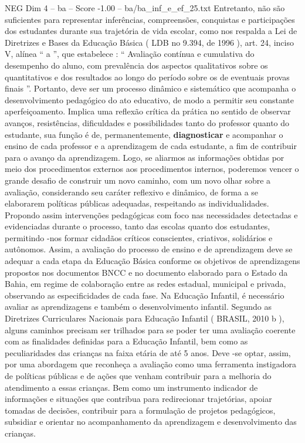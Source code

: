 \begin{textsample}{NEG Dim 4 – ba – Score -1.00 – ba/ba\_inf\_e\_ef\_25.txt}
Entretanto, não são suficientes para representar inferências, compreensões, conquistas e participações dos estudantes durante sua trajetória de vida escolar, como nos respalda a Lei de Diretrizes e Bases da Educação Básica ( LDB no 9.394, de 1996 ), art. 24, inciso V, alínea “ a ”, que estabelece : “ Avaliação contínua e cumulativa do desempenho do aluno, com prevalência dos aspectos qualitativos sobre os quantitativos e dos resultados ao longo do período sobre os de eventuais provas finais ”.
Portanto, deve ser um processo dinâmico e sistemático que acompanha o desenvolvimento pedagógico do ato educativo, de modo a permitir seu constante aperfeiçoamento.
Implica uma reflexão crítica da prática no sentido de observar avanços, resistências, dificuldades e possibilidades tanto do professor quanto do estudante, sua função é de, permanentemente, \textbf{diagnosticar} e acompanhar o ensino de cada professor e a aprendizagem de cada estudante, a fim de contribuir para o avanço da aprendizagem.
Logo, se aliarmos as informações obtidas por meio dos procedimentos externos aos procedimentos internos, poderemos vencer o grande desafio de construir um novo caminho, com um novo olhar sobre a avaliação, considerando seu caráter reflexivo e dinâmico, de forma a se elaborarem políticas públicas adequadas, respeitando as individualidades.
Propondo assim intervenções pedagógicas com foco nas necessidades detectadas e evidenciadas durante o processo, tanto das escolas quanto dos estudantes, permitindo -nos formar cidadãos críticos conscientes, criativos, solidários e autônomos.
Assim, a avaliação do processo de ensino e de aprendizagem deve se adequar a cada etapa da Educação Básica conforme os objetivos de aprendizagens propostos nos documentos BNCC e no documento elaborado para o Estado da Bahia, em regime de colaboração entre as redes estadual, municipal e privada, observando as especificidades de cada fase.
Na Educação Infantil, é necessário avaliar as aprendizagens e também o desenvolvimento infantil.
Segundo as Diretrizes Curriculares Nacionais para Educação Infantil ( BRASIL, 2010 b ), alguns caminhos precisam ser trilhados para se poder ter uma avaliação coerente com as finalidades definidas para a Educação Infantil, bem como as peculiaridades das crianças na faixa etária de até 5 anos.
Deve -se optar, assim, por uma abordagem que reconheça a avaliação como uma ferramenta instigadora de políticas públicas e de ações que venham contribuir para a melhoria do atendimento a essas crianças.
Bem como um instrumento indicador de informações e situações que contribua para redirecionar trajetórias, apoiar tomadas de decisões, contribuir para a formulação de projetos pedagógicos, subsidiar e orientar no acompanhamento da aprendizagem e desenvolvimento das crianças.

\end{textsample}
